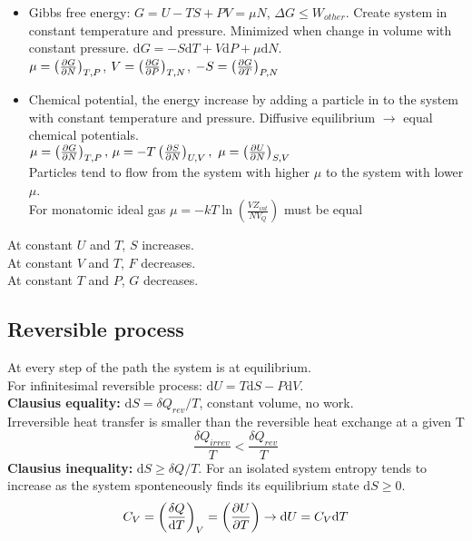 \documentclass[a4paper, norsk, 8pt]{article}
\begin{document}
\begin{multicols*}{3}
\begin{itemize}
    \item  Gibbs free energy: $G=U-TS+PV = \mu N$, $\Delta G \leq W_{other}$. Create system in constant temperature and pressure. Minimized when change in volume with constant pressure. $\mbox{d}G = -S\mbox{d}T + V\mbox{d}P +\mu \mbox{d}N$. \\ $\mu=\left(\pdv{G}{N}\right)_{T,P}$, $V = \left(\pdv{G}{P}\right)_{T,N}$, $-S=\left( \pdv{G}{T} \right)_{P,N}$
    \item Chemical potential, the energy increase by adding a particle in to the system with constant temperature and pressure. Diffusive equilibrium $\rightarrow$ equal chemical potentials.\\
    $\mu=\left(\pdv{G}{N}\right)_{T,P}, \, \mu=-T\left( \pdv{S}{N} \right)_{U,V}, \,\, \mu=\left( \pdv{U}{N} \right)_{S,V}$\\
    Particles tend to flow from the system with higher $\mu$ to the system with lower $\mu$.\\
    For monatomic ideal gas $\mu = -kT \ln{\left( \frac{VZ_{int}}{NV_Q} \right)}$ must be equal
\end{itemize}
At constant $U$ and $T$, $S$ increases.\\
At constant $V$ and $T$, $F$ decreases.\\
At constant $T$ and $P$, $G$ decreases.\\

\subsection*{\footnotesize  Reversible process}
At every step of the path the system is at equilibrium.\\ For infinitesimal reversible process: $\mbox{d}U = T\mbox{d}S - P \mbox{d}V$.\\
\textbf{Clausius equality:} $\mbox{d}S = \delta Q_{rev}/T$, constant volume, no work.\\
Irreversible	heat	transfer		is	smaller than the reversible	heat
exchange at	a	given	T
$$\frac{\delta Q_{irrev}}{T}  < \frac{\delta Q_{rev}}{T} $$
\textbf{Clausius inequality:} $\mbox{d}S \geq \delta Q/T$. For an isolated system entropy tends to	increase as	the system	sponteneously finds its equilibrium state $\mbox{d}S \geq 0$.
\begin{align*}
  C_V = \left( \frac{\delta Q}{\mbox{d}T} \right)_V = \left( \pdv{U}{T} \right) \rightarrow \mbox{d}U = C_V \mbox{d}T
\end{align*}


\end{multicols*}
\end{document}
